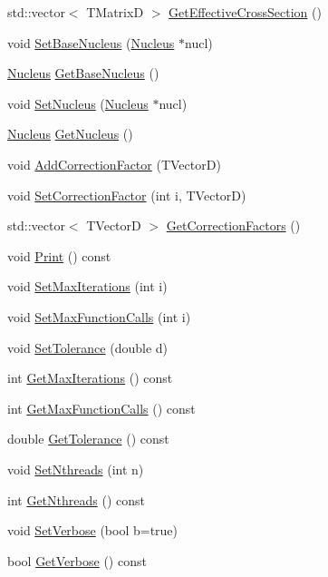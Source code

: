 \begin{DoxyCompactItemize}
std\-::vector$<$ T\-Matrix\-D $>$ \hyperlink{classCoulExFitter_ac7290cf5ca6893275050ef26161b2832}{Get\-Effective\-Cross\-Section} ()
\item 
void \hyperlink{classCoulExFitter_a1c7724db2db1fd9c41e7daf28cbf5271}{Set\-Base\-Nucleus} (\hyperlink{classNucleus}{Nucleus} $\ast$nucl)
\item 
\hyperlink{classNucleus}{Nucleus} \hyperlink{classCoulExFitter_a70183f69951d7277f9b183f820210971}{Get\-Base\-Nucleus} ()
\item 
void \hyperlink{classCoulExFitter_a099e738fd3b6b62355db787c8268cd15}{Set\-Nucleus} (\hyperlink{classNucleus}{Nucleus} $\ast$nucl)
\item 
\hyperlink{classNucleus}{Nucleus} \hyperlink{classCoulExFitter_a0c587c7748683456fd558bad426c1fe1}{Get\-Nucleus} ()
\item 
void \hyperlink{classCoulExFitter_acd5ed89489dfbb4ec2a480d5ae933b04}{Add\-Correction\-Factor} (T\-Vector\-D)
\item 
void \hyperlink{classCoulExFitter_aec7d01311ac98f4e6a909cc76ee79a1a}{Set\-Correction\-Factor} (int i, T\-Vector\-D)
\item 
std\-::vector$<$ T\-Vector\-D $>$ \hyperlink{classCoulExFitter_ac99895ede79f2918b619f1def61ee768}{Get\-Correction\-Factors} ()
\item 
void \hyperlink{classCoulExFitter_a92e5a9e3b4fbbf8d3df93543d2bf00c5}{Print} () const 
\item 
void \hyperlink{classCoulExFitter_af64c86ac6a7c93c8bc5cbe45f072afb3}{Set\-Max\-Iterations} (int i)
\item 
void \hyperlink{classCoulExFitter_aa4176694fecb8647bf90443c0be564d4}{Set\-Max\-Function\-Calls} (int i)
\item 
void \hyperlink{classCoulExFitter_a9abeddb0f114d7dcc70309f03f54dd01}{Set\-Tolerance} (double d)
\item 
int \hyperlink{classCoulExFitter_abc2b196c4245b5c6f019a8a1f45eb00e}{Get\-Max\-Iterations} () const 
\item 
int \hyperlink{classCoulExFitter_a96352023871d7431849e35c23a59ee48}{Get\-Max\-Function\-Calls} () const 
\item 
double \hyperlink{classCoulExFitter_a6b78c02a350d2cdcaa42e105aab4cf88}{Get\-Tolerance} () const 
\item 
void \hyperlink{classCoulExFitter_a5ed39b91e4a9db0b148e3854dcf05d07}{Set\-Nthreads} (int n)
\item 
int \hyperlink{classCoulExFitter_a9e65723ca1492e71bd7f1ff9b457c1fb}{Get\-Nthreads} () const 
\item 
void \hyperlink{classCoulExFitter_aadbcd260ffdc402f24c122a549f08743}{Set\-Verbose} (bool b=true)
\item 
bool \hyperlink{classCoulExFitter_ad7f2ed3a90a161d3d7f8eb6571649da6}{Get\-Verbose} () const 
\end{DoxyCompactItemize}



